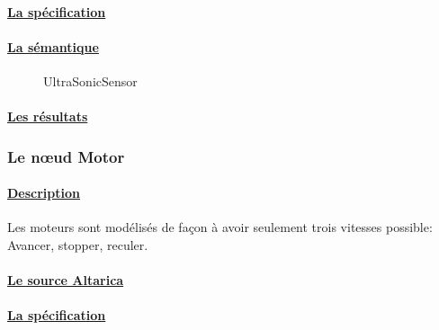     \paragraph{\underline{La spécification\\}}
    
    
    \paragraph{\underline{La sémantique\\}}
    \begin{figure}[!ht]
     \begin{center}
      \caption{UltraSonicSensor}
     \end{center}
    \end{figure}

    \paragraph{\underline{Les résultats\\}}
    
    
   
   \subsubsection{Le n\oe{}ud Motor}
  
    \paragraph{\underline{Description\\}}
    Les moteurs sont modélisés de façon à avoir seulement trois vitesses
    possible: Avancer, stopper, reculer.

    \paragraph{\underline{Le source Altarica\\}}
    
    
    \paragraph{\underline{La spécification\\}}
    
    
